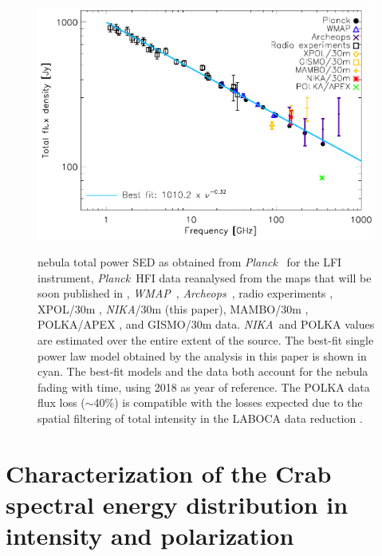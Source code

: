 \documentclass[twocolumn,traditabstract]{aa}
\def\NIKA{\textit{NIKA}}
\def\Archeops{\textit{Archeops}}
\def\Planck{\textit{Planck}}
\def\WMAP{\textit{WMAP}}
\begin{document}
\begin{figure}
  \centering
          { \includegraphics[width=1\linewidth,keepaspectratio]{figures/Crab_SED_int.pdf}}
           \caption{ nebula total power SED as obtained from \Planck\ \citep{2015arXiv150702058P} for the LFI instrument, \Planck\ HFI data reanalysed from the maps that will be soon published in \cite{planck2018}, \WMAP\ \citep{2011ApJS..192...19W}, \Archeops\ \citep{macias2007archeops}, radio experiments \citep{dmitrenko1970absolute, 1971IzVUZ..14..157V}, XPOL/30m \citep{aumont2010}, \NIKA/30m (this paper), MAMBO/30m \citep{2002A&A...386.1044B}, POLKA/APEX \citep{2014PASP..126.1027W}, and GISMO/30m \citep{2011ApJ...734...54A} data. \NIKA\ and POLKA values are estimated over the entire extent of the source. The best-fit single power law model obtained by the analysis in this paper is shown in cyan. The best-fit models and the data both account for the  nebula fading with time, using 2018 as year of reference. The POLKA data flux loss ($\sim$40\%) is compatible with the losses expected due to the spatial filtering of total intensity in the LABOCA data reduction \citep{2011A&A...527A.145B}.}
\label{crab_SED}                
  \end{figure} 

\section{Characterization of the Crab spectral energy distribution in intensity and polarization}\label{sec:Polarization intensity Spectral Energy Density (SED)}
\end{document}
